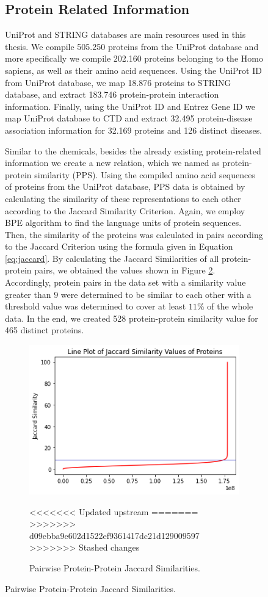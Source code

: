 \begin{figure}[h]
\subsection{Protein Related Information}
UniProt and STRING databases are main resources used in this thesis. We compile 505.250 proteins from the UniProt database and more specifically we compile 202.160 proteins belonging to the Homo sapiens, as well as their amino acid sequences. Using the UniProt ID from UniProt database, we map 18.876 proteins to STRING database, and extract 183.746 protein-protein interaction information. Finally, using the UniProt ID and Entrez Gene ID we map UniProt database to CTD and extract 32.495 protein-disease association information for 32.169 proteins and 126 distinct diseases.

Similar to the chemicals, besides the already existing protein-related information we create a new relation, which we named as protein-protein similarity (PPS). Using the compiled amino acid  sequences of proteins from the UniProt database, PPS data is obtained by calculating the similarity of these representations to each other according to the Jaccard Similarity Criterion. Again, we employ BPE algorithm to find the language units of protein sequences. Then, the similarity of the proteins was calculated in pairs according to the Jaccard Criterion using the formula given in Equation \ref{eq:jaccard}. By calculating the Jaccard Similarities of all protein-protein pairs, we obtained the values shown in Figure \ref{fig:pps}. Accordingly, protein pairs in the data set with a similarity value greater than $9$ were determined to be similar to each other with a threshold value was determined to cover at least $11\%$ of the whole data. In the end, we created 528 protein-protein similarity value for 465 distinct proteins.


\begin{figure}
    \centering
        \includegraphics[width=0.5\linewidth]{chapters/materials_and_methods/figures/pps_line.png}
    \caption{Pairwise Protein-Protein Jaccard Similarities.}
<<<<<<< Updated upstream
=======
>>>>>>> d09ebba9e602d1522ef9361417dc21d129009597
>>>>>>> Stashed changes
    \label{fig:pps}
\end{figure}


\end{figure}
